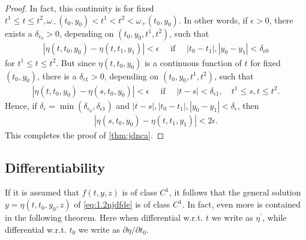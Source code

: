 \documentclass{article}
\begin{document}
\begin{proof}
In fact, this continuity is  for fixed $t^{1} \le t \le t^{2}, \omega_{-}\left(t_{0}, y_{0}\right)<t^{1}<t^{2}<\omega_{+}\left(t_{0}, y_{0}\right) .$ In other words, if $\epsilon>0$, there exists a $\delta_{\epsilon_{0}}>0$, depending on $\left(t_{0}, y_{0}, t^{1}, t^{2}\right)$, such that
\begin{align*}
\left|\eta\left(t, t_{0}, y_{0}\right)-\eta\left(t, t_{1}, y_{1}\right)\right|<\epsilon \quad \text { if } \quad\left|t_{0}-t_{1}\right|,\left|y_{0}-y_{1}\right|<\delta_{\epsilon 0}
\end{align*}
for $t^{1} \le t \le t^{2}$. But since $\eta\left(t, t_{0}, y_{0}\right)$ is a continuous function of $t$ for fixed $\left(t_{0}, y_{0}\right)$, there is a $\delta_{\epsilon 1}>0$, depending on $\left(t_{0}, y_{0}, t^{1}, t^{2}\right)$, such that
\begin{align*}
\left|\eta\left(t, t_{0}, y_{0}\right)-\eta\left(s, t_{0}, y_{0}\right)\right|<\epsilon \quad \text { if } \quad|t-s|<\delta_{\epsilon 1}, \quad t^{1} \le s, t \le t^{2} .
\end{align*}
Hence, if $\delta_{\epsilon}=\min \left(\delta_{\epsilon_{0}}, \delta_{\epsilon 1}\right)$ and $|t-s|,\left|t_{0}-t_{1}\right|,\left|y_{0}-y_{1}\right|<\delta_{\epsilon}$, then
\begin{align*}
\left|\eta\left(s, t_{0}, y_{0}\right)-\eta\left(t, t_{1}, y_{1}\right)\right|<2 \epsilon.
\end{align*}
This completes the proof of \cref{thm:jdnca}.
\end{proof} 
\subsection{Differentiability}
If it is assumed that $f(t, y, z)$ is of class $C^{1}$, it follows that the general solution $y=\eta\left(t, t_{0}, y_{0}, z\right)$ of \cref{eq:1.2njdfde} is of class $C^{1}$. In fact, even more is contained in the following theorem. Here when differential w.r.t. $t$ we write as $\eta^{\prime}$, while  differential w.r.t. $t_0$ we write as $ \partial\eta/\partial t_0 $.
\end{document}
